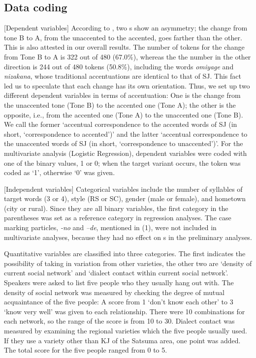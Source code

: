\documentclass[output=paper]{LSP/langsci}
\begin{document}
\subsection{Data coding}
[Dependent variables] According to \citet{kubozono_tonal_2007}, two s show an asymmetry; the change from tone B to A, from the unaccented to the accented, goes farther than the other. This is also attested in our overall results. The number of tokens for the change from Tone B to A is 322 out of 480 (67.0\%), whereas the the number in the other direction is 244 out of 480 tokens (50.8\%), including the words \textit{omiyage} and \textit{nizakana}, whose traditional accentuations are identical to that of SJ. This fact led us to speculate that each change has its own orientation. Thus, we set up two different dependent variables in terms of accentuation: One is the change from the unaccented tone (Tone B) to the accented one (Tone A); the other is the opposite, i.e., from the accented one (Tone A) to the unaccented one (Tone B). We call the former ‘accentual correspondence to the accented words of SJ (in short, ‘correspondence to accented’)’ and the latter ‘accentual correspondence to the unaccented words of SJ (in short, ‘correspondence to unaccented’)’. For the multivariate analysis (Logistic Regression), dependent variables were coded with one of the binary values, 1 or 0; when the target variant occurs, the token was coded as ‘1’, otherwise ‘0’ was given.

[Independent variables] Categorical variables include the number of syllables of target words (3 or 4), style (RS or SC), gender (male or female), and hometown (city or rural). Since they are all binary variables, the first category in the parentheses was set as a reference category in regression analyses. The case marking particles, \textit{{}-no} and \textit{–de}, mentioned in (1), were not included in multivariate analyses, because they had no effect on s in the preliminary analyses.

Quantitative variables are classified into three categories. The first indicates the possibility of taking in variation from other varieties, the other two are ‘density of current social network’ and ‘dialect contact within current social network’. Speakers were asked to list five people who they usually hang out with. The density of social network was measured by checking the degree of mutual acquaintance of the five people: A score from 1 ‘don’t know each other’ to 3 ‘know very well’ was given to each relationship. There were 10 combinations for each network, so the range of the score is from 10 to 30. Dialect contact was measured by examining the regional varieties which the five people usually used. If they use a variety other than KJ of the Satsuma area, one point was added. The total score for the five people ranged from 0 to 5.
\end{document}
